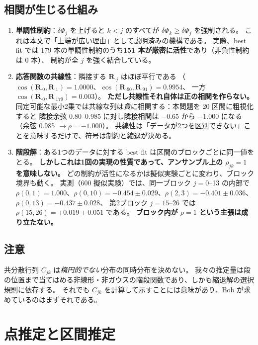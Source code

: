 \documentclass[11pt,a4paper]{ltjsarticle}
\newcommand{\dP}{\delta\Phi}
\begin{document}
\subsection{相関が生じる仕組み}
\begin{enumerate}\itemsep3pt
\item \textbf{単調性制約}：$\dP_j$ を上げると $k<j$ のすべてが $\dP_k\ge\dP_j$ を強制される。
これは本文で「上端が広い理由」として説明済みの機構である。
実際、best fit では 179 本の単調性制約のうち\textbf{151 本が厳密に活性}であり（非負性制約は 0 本）、
制約が全 $j$ を強く結合している。
\item \textbf{応答関数の共線性}：隣接する $\bm R_{\cdot j}$ はほぼ平行である
（$\cos(\bm R_{\cdot0},\bm R_{\cdot1})=1.0000$、$\cos(\bm R_{\cdot90},\bm R_{\cdot91})=0.9954$、
一方 $\cos(\bm R_{\cdot0},\bm R_{\cdot179})=0.003$）。
\textbf{ただし共線性それ自体は正の相関を作らない。}
同定可能な最小2乗では共線な列は\emph{負}に相関する：本問題を 20 区間に粗視化すると
隣接余弦 0.80--0.985 に対し隣接相関は $-0.65$ から $-1.000$ になる（余弦 0.985 $\to\rho=-1.000$）。
共線性は「データが2つを区別できない」ことを意味するだけで、符号は制約と縮退が決める。
\item \textbf{階段解}：ある1つのデータに対する best fit は区間のブロックごとに同一値をとる。
\textbf{しかしこれは1回の実現の性質であって、アンサンブル上の $\rho_{jk}=1$ を意味しない。}
どの制約が活性になるかは擬似実験ごとに変わり、ブロック境界も動く。
実測（600 擬似実験）では、同一ブロック $j=0$--13 の内部で
$\rho(0,1)=1.000$、$\rho(0,10)=-0.454\pm0.029$、$\rho(2,3)=-0.401\pm0.036$、$\rho(0,13)=-0.437\pm0.028$、
第2ブロック $j=15$--26 では $\rho(15,26)=+0.019\pm0.051$ である。
\textbf{ブロック内が $\rho=1$ という主張は成り立たない。}
\end{enumerate}

\subsection{注意}
共分散行列 $C_{jk}$ は\emph{楕円的でない}分布の同時分布を決めない。
我々の推定量は段の位置まで当てはめる非線形・非ガウスの階段関数であり、しかも縮退解の選択規則に依存する。
それでも $C_{jk}$ を計算して示すことには意味があり、Bob が求めているのはまずそれである。

\section{点推定と区間推定}
\end{document}
